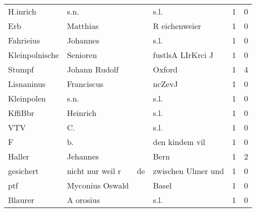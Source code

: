 \begin{center}
\begin{tiny}
\begin{longtabu}{llllrr}
                 H.inrich &                               s.n. &             &                                        s.l. &          1 &         0 \\
                      Erb &                           Matthias &             &                               R eichenweier &          1 &         0 \\
                Fahrieius &                           Johannes &             &                                        s.l. &          1 &         0 \\
           Kleinpolnische &                           Senioren &             &                           fustlsA LIrKrci J &          1 &         0 \\
                   Stumpf &                      Johann Rudolf &             &                                      Oxford &          1 &         4 \\
               Lisnaninus &                         Franciscus &             &                                      ncZevJ &          1 &         0 \\
               Kleinpolen &                               s.n. &             &                                        s.l. &          1 &         0 \\
                  KffiBbr &                           Heinrich &             &                                        s.l. &          1 &         0 \\
                      VTV &                                 C. &             &                                        s.l. &          1 &         0 \\
                        F &                                 b. &             &                              den kindem vil &          1 &         0 \\
                   Haller &                           Jehannes &             &                                        Bern &          1 &         2 \\
                gesichert &                   nicht nur weil r &          de &                          zwischen Ulmer und &          1 &         0 \\
                      ptf &                    Myconius Oswald &             &                                       Basel &          1 &         0 \\
                  Blaurer &                          A orosius &             &                                        s.l. &          1 &         0 \\

\end{longtabu}
\end{tiny}
\end{center}
